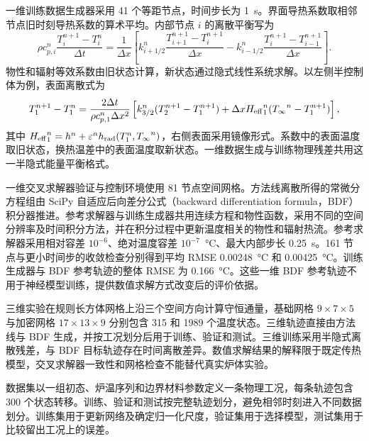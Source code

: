 一维训练数据生成器采用 41 个等距节点，时间步长为 \SI{1}{\second}。界面导热系数取相邻节点旧时刻导热系数的算术平均。内部节点 $i$ 的离散平衡写为
\begin{equation}
  \rho c_{p,i}^{n}\frac{T_i^{n+1}-T_i^n}{\Delta t}
  =\frac{1}{\Delta x}
  \left[
    k_{i+1/2}^{n}\frac{T_{i+1}^{n+1}-T_i^{n+1}}{\Delta x}
    -k_{i-1/2}^{n}\frac{T_i^{n+1}-T_{i-1}^{n+1}}{\Delta x}
  \right].
  \label{eq:discrete_balance}
\end{equation}
物性和辐射等效系数由旧状态计算，新状态通过隐式线性系统求解。以左侧半控制体为例，表面离散式为
\begin{equation}
  T_1^{n+1}-T_1^n
  =\frac{2\Delta t}{\rho c_{p,1}^{n}\Delta x^2}
  \left[
    k_{3/2}^{n}(T_2^{n+1}-T_1^{n+1})
    +\Delta x{H_{\mathrm{eff}}}_1^n({T_{\infty}}^n-T_1^{n+1})
  \right],
  \label{eq:surface_discrete_balance}
\end{equation}
其中 ${H_{\mathrm{eff}}}_1^n=h^n+\varepsilon^nh_{\mathrm{rad}}(T_1^n,{T_{\infty}}^n)$，右侧表面采用镜像形式。系数中的表面温度取旧状态，换热温差中的表面温度取新状态。一维数据生成与训练物理残差共用这一半隐式能量平衡格式。

一维交叉求解器验证与控制环境使用 81 节点空间网格。方法线离散所得的常微分方程组由 SciPy 自适应后向差分公式（backward differentiation formula，BDF）积分器推进。参考求解器与训练生成器共用连续方程和物性函数，采用不同的空间分辨率及时间积分方法，并在积分过程中更新温度相关的物性和辐射热流。参考求解器采用相对容差 $10^{-6}$、绝对温度容差 $10^{-7}$~\si{\degreeCelsius}、最大内部步长 \SI{0.25}{\second}。161 节点与更小时间步的收敛检查分别得到平均 RMSE \SI{0.00248}{\degreeCelsius} 和 \SI{0.00425}{\degreeCelsius}。训练生成器与 BDF 参考轨迹的整体 RMSE 为 \SI{0.166}{\degreeCelsius}。这些一维 BDF 参考轨迹不用于神经模型训练，提供数值求解方式改变后的评价依据。

三维实验在规则长方体网格上沿三个空间方向计算守恒通量，基础网格 $9\times7\times5$ 与加密网格 $17\times13\times9$ 分别包含 315 和 1989 个温度状态。三维轨迹直接由方法线与 BDF 生成，并按工况划分后用于训练、验证和测试。三维训练采用半隐式离散残差，与 BDF 目标轨迹存在时间离散差异。数值求解结果的解释限于既定传热模型，交叉求解器一致性和网格检查不能替代真实炉体实验。

\label{sec:dataset-design}

数据集以一组初态、炉温序列和边界材料参数定义一条物理工况，每条轨迹包含 300 个状态转移。训练、验证和测试按完整轨迹划分，避免相邻时刻进入不同数据划分。训练集用于更新网络及确定归一化尺度，验证集用于选择模型，测试集用于比较留出工况上的误差。

